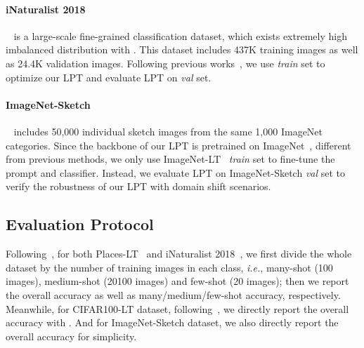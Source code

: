 \documentclass{article} \usepackage{iclr2023_conference,times}
\begin{document}
\paragraph{iNaturalist 2018}~\citep{van2018inaturalist} is a large-scale fine-grained classification dataset, which exists extremely high imbalanced distribution with . This dataset includes 437K training images as well as 24.4K validation images. Following previous works~\citep{Kang2020Decoupling,cui2019cbloss}, we use \textit{train} set to optimize our LPT and evaluate LPT on \textit{val} set. 

\paragraph{ImageNet-Sketch}~\citep{wang2022learning} includes 50,000 individual sketch images from the same 1,000 ImageNet categories. Since the backbone of our LPT is pretrained on ImageNet~\citep{deng2009imagenet}, different from previous methods, we only use ImageNet-LT~\citep{openlongtailrecognition} \textit{train} set to fine-tune the prompt and classifier. Instead, we evaluate LPT on ImageNet-Sketch \textit{val} set to verify the robustness of our LPT with domain shift scenarios. 

\subsection{Evaluation Protocol}
Following~\citet{cui2021parametric,tian2021vl,Long2022}, for both Places-LT~\citep{zhou2017places} and iNaturalist 2018~\cite{van2018inaturalist}, we first divide the whole dataset by the number of training images in each class, \textit{i.e.}, many-shot (100 images), medium-shot (20100 images) and few-shot (20 images);
then we report the overall accuracy as well as many/medium/few-shot accuracy, respectively. 
Meanwhile, for CIFAR100-LT dataset, following~\citet{cui2021parametric,Li2022Long}, we directly report the overall accuracy with .
And for ImageNet-Sketch dataset, we also directly report the overall accuracy for simplicity. 
\end{document}

